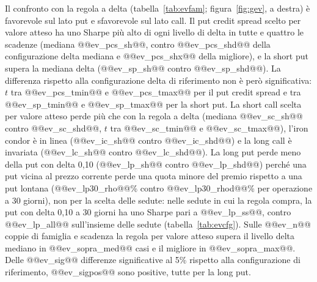 \documentclass[11pt,a4paper]{article}
\begin{document}
Il confronto con la regola a delta (tabella~\ref{tab:evfam}; figura~\ref{fig:gev}, a destra) è favorevole sul lato put e sfavorevole sul lato call. Il put credit spread scelto per valore atteso ha uno Sharpe più alto di ogni livello di delta in tutte e quattro le scadenze (mediana @@ev_pcs_sh@@, contro @@ev_pcs_shd@@ della configurazione delta mediana e @@ev_pcs_shx@@ della migliore), e la short put supera la mediana delta (@@ev_sp_sh@@ contro @@ev_sp_shd@@). La differenza rispetto alla configurazione delta di riferimento non è però significativa: $t$ tra @@ev_pcs_tmin@@ e @@ev_pcs_tmax@@ per il put credit spread e tra @@ev_sp_tmin@@ e @@ev_sp_tmax@@ per la short put. La short call scelta per valore atteso perde più che con la regola a delta (mediana @@ev_sc_sh@@ contro @@ev_sc_shd@@, $t$ tra @@ev_sc_tmin@@ e @@ev_sc_tmax@@), l'iron condor è in linea (@@ev_ic_sh@@ contro @@ev_ic_shd@@) e la long call è invariata (@@ev_lc_sh@@ contro @@ev_lc_shd@@). La long put perde meno della put con delta 0{,}10 (@@ev_lp_sh@@ contro @@ev_lp_shd@@) perché una put vicina al prezzo corrente perde una quota minore del premio rispetto a una put lontana (@@ev_lp30_rho@@\% contro @@ev_lp30_rhod@@\% per operazione a 30 giorni), non per la scelta delle sedute: nelle sedute in cui la regola compra, la put con delta 0{,}10 a 30 giorni ha uno Sharpe pari a @@ev_lp_ss@@, contro @@ev_lp_all@@ sull'insieme delle sedute (tabella~\ref{tab:evcfg}). Sulle @@ev_n@@ coppie di famiglia e scadenza la regola per valore atteso supera il livello delta mediano in @@ev_sopra_med@@ casi e il migliore in @@ev_sopra_max@@. Delle @@ev_sig@@ differenze significative al 5\% rispetto alla configurazione di riferimento, @@ev_sigpos@@ sono positive, tutte per la long put.

\begin{table}[ht]\centering\footnotesize
\caption{Regola EV e regola a delta nelle configurazioni rappresentative della sottosezione~\ref{sec:gstrike}, prezzi bid-ask, 2012--2023. Per ogni famiglia: regola EV, regola a delta su tutte le sedute e regola a delta sulle sole sedute in cui la regola EV apre un'operazione. Numero di operazioni, delta medio in valore assoluto della gamba principale, larghezza in percentuale del forward, rendimento per operazione atteso e realizzato, quota di operazioni in utile, media annua, Sharpe, \emph{drawdown} massimo e mese peggiore del \emph{ladder} mensile sul margine; statistica $t$ (Newey--West) della differenza dei rendimenti mensili tra la regola EV e la regola a delta su tutte le sedute.}\label{tab:evcfg}
\end{table}
\end{document}
